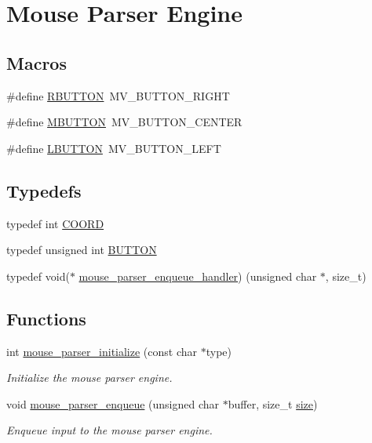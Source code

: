 \hypertarget{group__libmisc__mouseparser}{}\section{Mouse Parser Engine}
\label{group__libmisc__mouseparser}
\subsection*{Macros}
\begin{DoxyCompactItemize}
\item 
\#define \mbox{\hyperlink{group__libmisc__mouseparser_ga98086f239e2514a82512a9caf0c10f91}{R\+B\+U\+T\+T\+ON}}~M\+V\+\_\+\+B\+U\+T\+T\+O\+N\+\_\+\+R\+I\+G\+HT
\item 
\#define \mbox{\hyperlink{group__libmisc__mouseparser_ga01d661af045b5e9e3ecbe6a36e533044}{M\+B\+U\+T\+T\+ON}}~M\+V\+\_\+\+B\+U\+T\+T\+O\+N\+\_\+\+C\+E\+N\+T\+ER
\item 
\#define \mbox{\hyperlink{group__libmisc__mouseparser_ga7beb9682b87ae7b91cdb9148411ffb1e}{L\+B\+U\+T\+T\+ON}}~M\+V\+\_\+\+B\+U\+T\+T\+O\+N\+\_\+\+L\+E\+FT
\end{DoxyCompactItemize}
\subsection*{Typedefs}
\begin{DoxyCompactItemize}
\item 
typedef int \mbox{\hyperlink{group__libmisc__mouseparser_ga91efc26ca15050f533dd86e543b8ecdd}{C\+O\+O\+RD}}
\item 
typedef unsigned int \mbox{\hyperlink{group__libmisc__mouseparser_ga07e20c1150a01a90e2cb12dcb752f969}{B\+U\+T\+T\+ON}}
\item 
typedef void($\ast$ \mbox{\hyperlink{group__libmisc__mouseparser_gaf26702b93b78d291461e340effca0fcc}{mouse\+\_\+parser\+\_\+enqueue\+\_\+handler}}) (unsigned char $\ast$, size\+\_\+t)
\end{DoxyCompactItemize}
\subsection*{Functions}
\begin{DoxyCompactItemize}
\item 
int \mbox{\hyperlink{group__libmisc__mouseparser_ga8fecea0e5c8c28c77ce0b80a70827302}{mouse\+\_\+parser\+\_\+initialize}} (const char $\ast$type)
\begin{DoxyCompactList}\small\item\em Initialize the mouse parser engine. \end{DoxyCompactList}\item 
void \mbox{\hyperlink{group__libmisc__mouseparser_ga95a92fecbb5e07b8c34596d3f67bfefa}{mouse\+\_\+parser\+\_\+enqueue}} (unsigned char $\ast$buffer, size\+\_\+t \mbox{\hyperlink{sun4u_2tte_8h_a245260f6f74972558f61b85227df5aae}{size}})
\begin{DoxyCompactList}\small\item\em Enqueue input to the mouse parser engine. \end{DoxyCompactList}\end{DoxyCompactItemize}


